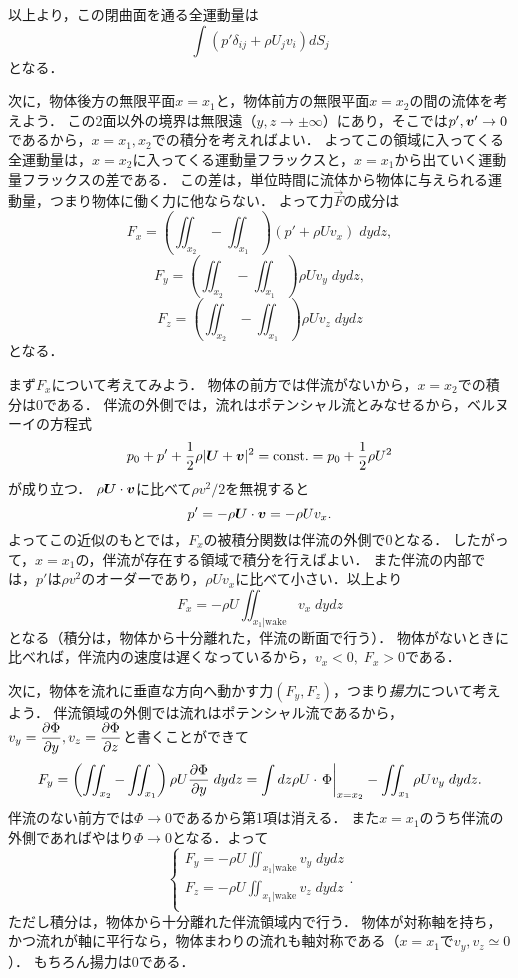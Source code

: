 以上より，この閉曲面を通る全運動量は
\[
    \int (p' \delta_{ij} + \rho U_j v_i) dS_j
\]
となる．




次に，物体後方の無限平面$x=x_1$と，物体前方の無限平面$x=x_2$の間の流体を考えよう．
この2面以外の境界は無限遠（$y,z \to \pm \infty$）にあり，そこでは$p', \vb*{v}' \to 0$であるから，$x=x_1, x_2$での積分を考えればよい．
よってこの領域に入ってくる全運動量は，$x=x_2$に入ってくる運動量フラックスと，$x=x_1$から出ていく運動量フラックスの差である．
この差は，単位時間に流体から物体に与えられる運動量，つまり物体に働く力に他ならない．
よって力$\vec{F}$の成分は
\[
    F_x = \left( \iint_{x_2} - \iint_{x_1} \right) (p' + \rho U v_x) \; dydz,
\]
\[
    F_y = \left( \iint_{x_2} - \iint_{x_1} \right) \rho U v_y \; dydz,
\]
\[
    F_z = \left( \iint_{x_2} - \iint_{x_1} \right) \rho U v_z\; dydz
\]
となる．

まず$F_x$について考えてみよう．
物体の前方では伴流がないから，$x=x_2$での積分は0である．
伴流の外側では，流れはポテンシャル流とみなせるから，ベルヌーイの方程式
\[
    p_0 + p' + \frac{1}{2}\rho |\vb*{U}+\vb*{v}|^2 = \mathrm{const.} = p_0 + \frac{1}{2}\rho U^2
\]
が成り立つ．
$\rho \vb*{U}\cdot\vb*{v}$に比べて$\rho v^2/2$を無視すると
\[
    p' = -\rho \vb*{U}\cdot\vb*{v} = -\rho U v_x.
\]
よってこの近似のもとでは，$F_x$の被積分関数は伴流の外側で0となる．
したがって，$x=x_1$の，伴流が存在する領域で積分を行えばよい．
また伴流の内部では，$p'$は$\rho v^2$のオーダーであり，$\rho U v_x$に比べて小さい．以上より
\begin{equation}\label{eq21.1:伴流でのFx}
    F_x = -\rho U \iint_{x_1 | \mathrm{wake}} v_x \; dydz
\end{equation}
となる（積分は，物体から十分離れた，伴流の断面で行う）．
物体がないときに比べれば，伴流内の速度は遅くなっているから，$v_x<0,\;F_x>0$である．




次に，物体を流れに垂直な方向へ動かす力$(F_y, F_z)$，つまり\emph{揚力}について考えよう．
伴流領域の外側では流れはポテンシャル流であるから，$v_y = \dpdv{\Phi}{y}, v_z = \dpdv{\Phi}{z}$と書くことができて
\[
    F_y = \left( \iint_{x_2} - \iint_{x_1} \right) \rho U \pdv{\Phi}{y} \; dydz
    = \int dz \rho U \cdot \eval{\Phi}_{x=x_2} - \iint_{x_1} \rho U v_y \; dydz .
\]
伴流のない前方では$\Phi\to0$であるから第1項は消える．
また$x=x_1$のうち伴流の外側であればやはり$\Phi\to0$となる．よって
\begin{equation}
    \begin{cases}
        \displaystyle F_y = - \rho U \iint_{x_1 | \mathrm{wake}} v_y \; dydz \\[10pt]
        \displaystyle F_z = - \rho U \iint_{x_1 | \mathrm{wake}} v_z \; dydz \\[10pt]
    \end{cases} .
\end{equation}
ただし積分は，物体から十分離れた伴流領域内で行う．
物体が対称軸を持ち，かつ流れが軸に平行なら，物体まわりの流れも軸対称である（$x=x_1$で$v_y, v_z \simeq 0$）．
もちろん揚力は0である．



